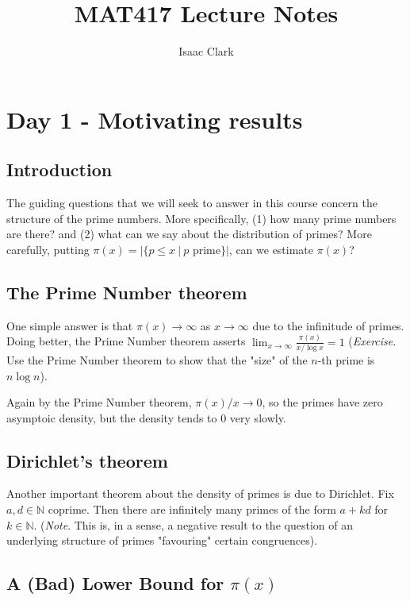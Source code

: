 \documentclass[12pt]{article}
\title{MAT417 Lecture Notes}
\author{Isaac Clark}
\newcommand{\nats}{\mathbb{N}}
\numberwithin{equation}{section}
\numberwithin{thm}{section}
\numberwithin{lemma}{section}
\begin{document}
\maketitle 

\section{Day 1 - Motivating results}

\subsection{Introduction}

The guiding questions that we will seek to answer in this course concern the structure of the prime numbers. More specifically, (1) how many prime numbers are there? and (2) what can we say about the distribution of primes? More carefully, putting $\pi(x) = |\{ p \leq x \ | \ p \text{ prime} \}|$, can we estimate $\pi(x)$? 

\subsection{The Prime Number theorem}

One simple answer is that $\pi(x) \to \infty$ as $x \to \infty$ due to the infinitude of primes. Doing better, the Prime Number theorem asserts $\lim_{x \to \infty} \frac{\pi(x)}{x / \log x} = 1$ (\textit{Exercise}. Use the Prime Number theorem to show that the "size" of the $n$-th prime is $n \log n$). 

Again by the Prime Number theorem, $\pi(x)/x \to 0$, so the primes have zero asymptoic density, but the density tends to $0$ very slowly.

\subsection{Dirichlet's theorem}

Another important theorem about the density of primes is due to Dirichlet. Fix $a, d \in \nats$ coprime. Then there are infinitely many primes of the form $a + kd$ for $k \in \nats$. (\textit{Note}. This is, in a sense, a negative result to the question of an underlying structure of primes "favouring" certain congruences).

\subsection{A (Bad) Lower Bound for $\pi(x)$}
\end{document}
